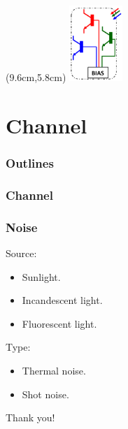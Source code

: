 \documentclass[mathserif]{beamer}
\begin{document}
\begin{frame}
	\begin{textblock*}{2cm}(9.6cm,5.8cm) %
		\includegraphics[width=2cm]{figuras/pd.png}
	\end{textblock*}
\end{frame}


\section{Channel}
\begin{frame}
\frametitle{Outlines}
	\small
	\tableofcontents[currentsection]
\end{frame}
\begin{frame}
\frametitle{Channel}

\end{frame}

\begin{frame}
\frametitle{Noise}
	Source:
	\begin{itemize}
		\item Sunlight.
		\item Incandescent light.
		\item Fluorescent light.
	\end{itemize}
	Type:
	\begin{itemize}
		\item Thermal noise.
		\item Shot noise.
	\end{itemize}
\end{frame}

\begin{frame}[noframenumbering]
	\vfill
	\centering
	\Huge{Thank you!}
	\vfill
\end{frame}
\end{document}
